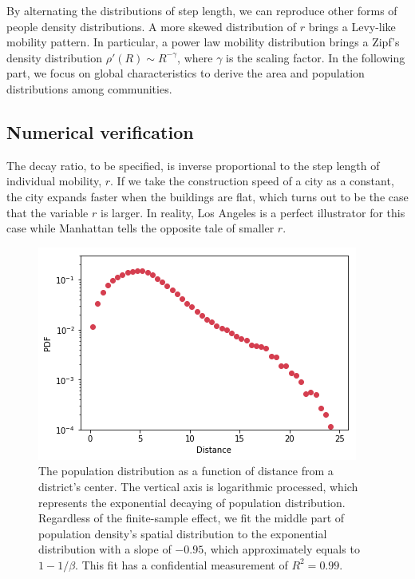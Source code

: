 \documentclass[aps,prl]{revtex4-1}
\begin{document}
By alternating the distributions of step length, we can reproduce other forms of people density distributions. A more skewed distribution of $r$ brings a Levy-like mobility pattern. In particular, a power law mobility distribution brings a Zipf's density distribution $\rho '(R)\sim R^{-\gamma}$\cite{PhysRevX.4.011008}, where $\gamma$ is the scaling factor.  In the following part, we focus on global characteristics to derive the area and population distributions among communities.

\subsection{Numerical verification}

The decay ratio, to be specified, is inverse proportional to the step length of individual mobility, $r$. If we take the construction speed of a city as a constant, the city expands faster when the buildings are flat, which turns out to be the case that the variable $r$ is larger. In reality, Los Angeles is a perfect illustrator for this case while Manhattan tells the opposite tale of smaller $r$.

\begin{figure}[ht]
\centering
\includegraphics[width=0.9\linewidth]{fig/clark.png}
\caption{The population distribution as a function of distance from a district's center. The vertical axis is logarithmic processed, which represents the exponential decaying of population distribution. Regardless of the finite-sample effect, we fit the middle part of population density's spatial distribution to the exponential distribution with a slope of $-0.95$, which approximately equals to $1-1/\beta.$ This fit has a confidential measurement of $R^2=0.99$.}
\label{fig:clark}
\end{figure}
\end{document}
